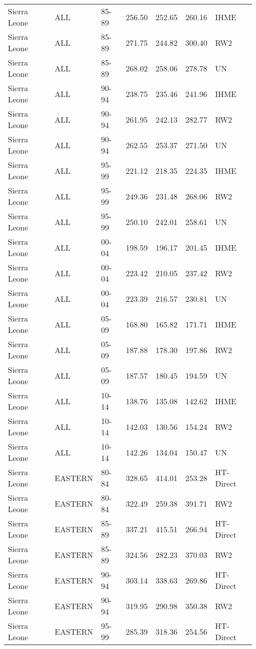 \begin{longtable}{lllrrrl}
  Sierra Leone & ALL & 85-89 & 256.50 & 252.65 & 260.16 & IHME \\ 
  Sierra Leone & ALL & 85-89 & 271.75 & 244.82 & 300.40 & RW2 \\ 
  Sierra Leone & ALL & 85-89 & 268.02 & 258.06 & 278.78 & UN \\ 
  Sierra Leone & ALL & 90-94 & 238.75 & 235.46 & 241.96 & IHME \\ 
  Sierra Leone & ALL & 90-94 & 261.95 & 242.13 & 282.77 & RW2 \\ 
  Sierra Leone & ALL & 90-94 & 262.55 & 253.37 & 271.50 & UN \\ 
  Sierra Leone & ALL & 95-99 & 221.12 & 218.35 & 224.35 & IHME \\ 
  Sierra Leone & ALL & 95-99 & 249.36 & 231.48 & 268.06 & RW2 \\ 
  Sierra Leone & ALL & 95-99 & 250.10 & 242.01 & 258.61 & UN \\ 
  Sierra Leone & ALL & 00-04 & 198.59 & 196.17 & 201.45 & IHME \\ 
  Sierra Leone & ALL & 00-04 & 223.42 & 210.05 & 237.42 & RW2 \\ 
  Sierra Leone & ALL & 00-04 & 223.39 & 216.57 & 230.81 & UN \\ 
  Sierra Leone & ALL & 05-09 & 168.80 & 165.82 & 171.71 & IHME \\ 
  Sierra Leone & ALL & 05-09 & 187.88 & 178.30 & 197.86 & RW2 \\ 
  Sierra Leone & ALL & 05-09 & 187.57 & 180.45 & 194.59 & UN \\ 
  Sierra Leone & ALL & 10-14 & 138.76 & 135.08 & 142.62 & IHME \\ 
  Sierra Leone & ALL & 10-14 & 142.03 & 130.56 & 154.24 & RW2 \\ 
  Sierra Leone & ALL & 10-14 & 142.26 & 134.04 & 150.47 & UN \\ 
  Sierra Leone & EASTERN & 80-84 & 328.65 & 414.01 & 253.28 & HT-Direct \\ 
  Sierra Leone & EASTERN & 80-84 & 322.49 & 259.38 & 391.71 & RW2 \\ 
  Sierra Leone & EASTERN & 85-89 & 337.21 & 415.51 & 266.94 & HT-Direct \\ 
  Sierra Leone & EASTERN & 85-89 & 324.56 & 282.23 & 370.03 & RW2 \\ 
  Sierra Leone & EASTERN & 90-94 & 303.14 & 338.63 & 269.86 & HT-Direct \\ 
  Sierra Leone & EASTERN & 90-94 & 319.95 & 290.98 & 350.38 & RW2 \\ 
  Sierra Leone & EASTERN & 95-99 & 285.39 & 318.36 & 254.56 & HT-Direct \\ 

\end{longtable}
